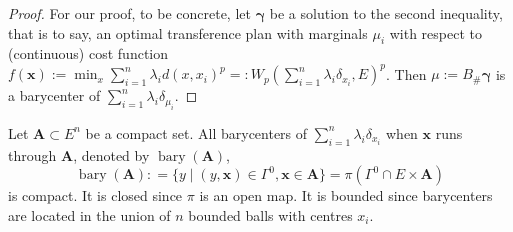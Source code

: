 \begin{proof}
	For our proof, to be concrete,
	let $\boldsymbol \gamma$ be a solution to the second inequality,
	that is to say,
	an optimal transference plan with marginals $\mu_i$ with respect to (continuous) cost function
	$f(\boldsymbol{x}):=\min_{x} \sum_{i=1}^{n} \lambda_i d(x, x_i)^p = : W_p(\sum_{i=1}^n \lambda_i \delta_{x_i}, E)^p$.
	Then $\mu:= B_{\#}\boldsymbol \gamma$ is a barycenter of $\sum_{i=1}^{n}\lambda_i \delta_{\mu_i}$.
\end{proof}

\begin{rmk}
	\label{rmk:barycenter_compact}
	Let $\boldsymbol{A} \subset E^n$ be a compact set.
	All barycenters of $\sum_{i=1}^n \lambda_i \delta_{x_i}$ when $\boldsymbol{x}$ runs through $\boldsymbol{A}$,
	denoted by $\operatorname{bary}( \boldsymbol{A} )$,
	\[
		\operatorname{bary}( \boldsymbol{A} ) :
		=\{y \mid (y, \boldsymbol{x}) \in \Gamma^0, \boldsymbol{x} \in \boldsymbol{A} \}
		= \pi ( \Gamma^0  \cap E \times \boldsymbol{A})
	\]
	is compact.
	It is closed since $\pi$ is an open map.
	It is bounded since barycenters are located in the union of $n$ bounded balls with centres $x_i$.
\end{rmk}

